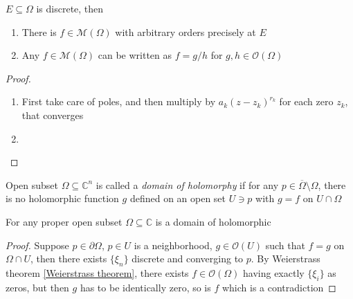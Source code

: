 \documentclass[../main.tex]{subfiles}
\begin{document}
\begin{theorem}\label{Weierstrass theorem}
$E\subseteq\Omega$ is discrete, then
\begin{enumerate}
\item There is $f\in\mathcal M(\Omega)$ with arbitrary orders precisely at $E$
\item Any $f\in\mathcal M(\Omega)$ can be written as $f=g/h$ for $g,h\in \mathcal O(\Omega)$
\end{enumerate}
\end{theorem}

\begin{proof}
\begin{enumerate}
\item First take care of poles, and then multiply by $a_k(z-z_k)^{r_k}$ for each zero $z_k$, that converges
\item 
\end{enumerate}
\end{proof}

\begin{definition}
Open subset $\Omega\subseteq\mathbb C^n$ is called a \textit{domain of holomorphy} if for any $p\in\overline\Omega\setminus\Omega$, there is no holomorphic function $g$ defined on an open set $U\ni p$ with $g=f$ on $U\cap \Omega$
\end{definition}

\begin{theorem}
For any proper open subset $\Omega\subseteq\mathbb C$ is a domain of holomorphic
\end{theorem}

\begin{proof}
Suppose $p\in\partial\Omega$, $p\in U$ is a neighborhood, $g\in\mathcal O(U)$ such that $f=g$ on $\Omega\cap U$, then there exists $\{\xi_n\}$ discrete and converging to $p$. By Weierstrass theorem \ref{Weierstrass theorem}, there exists $f\in\mathcal O(\Omega)$ having exactly $\{\xi_i\}$ as zeros, but then $g$ has to be identically zero, so is $f$ which is a contradiction
\end{proof}
\end{document}
